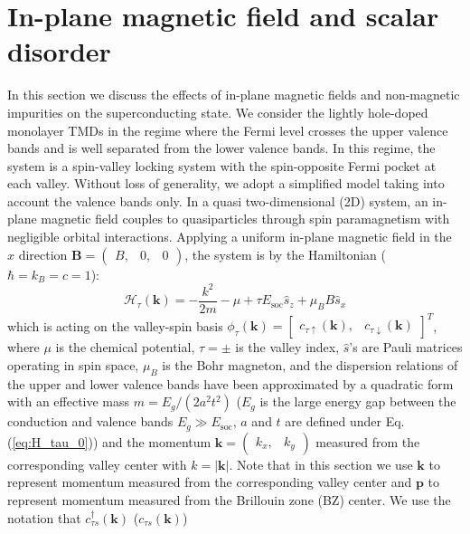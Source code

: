 \section{In-plane magnetic field and scalar disorder}

In this section we discuss the effects of in-plane magnetic fields
and non-magnetic impurities on the superconducting state. We consider
the lightly hole-doped monolayer TMDs in the regime where the Fermi
level crosses the upper valence bands and is well separated from the
lower valence bands. In this regime, the system is a spin-valley locking
system with the spin-opposite Fermi pocket at each valley. Without loss of generality, we adopt a simplified model taking
into account the valence bands only. In a quasi two-dimensional (2D)
system, an in-plane magnetic field couples to quasiparticles through
spin paramagnetism with negligible orbital interactions. Applying
a uniform in-plane magnetic field in the $x$ direction $\mathbf{B}=(\begin{array}{ccc}
B, & 0, & 0\end{array})$, the system is by the Hamiltonian ($\hbar=k_{B}=c=1$):
\begin{equation}
\mathcal{H}_{\tau}(\mathbf{k})=-\frac{k^{2}}{2m}-\mu+\tau E_{\text{soc}}\hat{s}_{z}+\mu_{B}B\hat{s}_{x}\label{eq: valley_Hamiltonian}
\end{equation}
which is acting on the valley-spin basis $\phi_{\tau}(\mathbf{k})=\left[\begin{array}{cc}
c_{\tau\uparrow}(\mathbf{k}), & c_{\tau\downarrow}(\mathbf{k})\end{array}\right]^{T}$, where $\mu$ is the chemical potential, $\tau=\pm$ is the valley
index, $\hat{s}$'s are Pauli matrices operating in spin space, $\mu_{B}$
is the Bohr magneton, and the dispersion relations of the upper and
lower valence bands have been approximated by a quadratic form with
an effective mass $m=E_{g}/\left(2a^{2}t^{2}\right)$ ($E_{g}$ is the large energy gap between the conduction and valence bands $E_{g}\gg E_{\text{soc}}$, $a$ and $t$ are defined under Eq. (\ref{eq:H_tau_0})) and the momentum $\mathbf{k}=\left(\begin{array}{cc}
k_{x}, & k_{y}\end{array}\right)$ measured from the corresponding valley center with $k=|\mathbf{k}|$.
Note that in this section we use $\mathbf{k}$ to represent momentum
measured from the corresponding valley center and $\mathbf{p}$ to
represent momentum measured from the Brillouin zone (BZ) center. We
use the notation that $c_{\tau s}^{\dagger}(\mathbf{k})$ ($c_{\tau s}(\mathbf{k})$)
